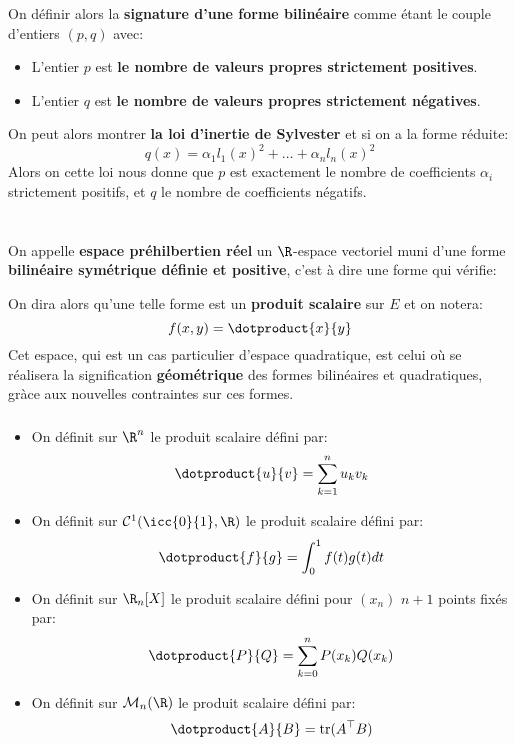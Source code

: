 \subsection*{}
On définir alors la \textbf{signature d'une forme bilinéaire} comme étant le couple d'entiers \((p, q)\) avec:
\begin{itemize}
   \item L'entier \(p\) est \textbf{le nombre de valeurs propres strictement positives}.
   \item L'entier \(q\) est \textbf{le nombre de valeurs propres strictement négatives}.
\end{itemize}
On peut alors montrer \textbf{la loi d'inertie de Sylvester} et si on a la forme réduite:
\[
   q(x) = \alpha_1l_1(x)^2 + \ldots + \alpha_nl_n(x)^2
\]
Alors on cette loi nous donne que \(p\) est exactement le nombre de coefficients \(\alpha_i\) strictement positifs, et \(q\) le nombre de coefficients négatifs.
\chapter*{}
On appelle \textbf{espace préhilbertien réel} un \(\R\)-espace vectoriel muni d'une forme \textbf{bilinéaire symétrique définie et positive}, c'est à dire une forme qui vérifie:

On dira alors qu'une telle forme est un \textbf{produit scalaire} sur \(E\) et on notera:
\[
   f(x, y) = \dotproduct{x}{y}
\]
Cet espace, qui est un cas particulier d'espace quadratique, est celui où se réalisera la signification \textbf{géométrique} des formes bilinéaires et quadratiques, gràce aux nouvelles contraintes sur ces formes.
\subsection*{}
\begin{itemize}
   \item On définit sur \(\R^n\) le produit scalaire défini par:
   \[
      \dotproduct{u}{v} = \sum_{k=1}^{n} u_kv_k    
   \]
   \item On définit sur \(\mathcal{C}^1(\icc{0}{1}, \R)\) le produit scalaire défini par:
   \[
      \dotproduct{f}{g} = \int_{0}^{1} f(t)g(t) d t    
   \]
   \item On définit sur \(\R_n[X]\) le produit scalaire défini pour \((x_n)\) \(n + 1\) points fixés par:
   \[
      \dotproduct{P}{Q} = \sum_{k=0}^{n}P(x_k)Q(x_k)
   \]   
   \item On définit sur \(\mathcal{M}_n(\R)\) le produit scalaire défini par:
   \[
      \dotproduct{A}{B} = \text{tr}(A^\top B)
   \]
\end{itemize}
